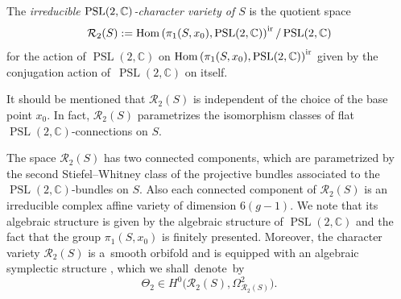 \documentclass[pdftex]{sigma}
\numberwithin{equation}{section}
\begin{document}
\begin{Definition}
The {\it irreducible ${\rm PSL}(2,{\mathbb C})$-character variety of $S$} is the quotient space
\begin{equation}\label{e11}
{\mathcal R}_2(S) := \operatorname{Hom}\left(\pi_1(S, x_0), \operatorname{PSL}(2,{\mathbb C})\right)^{\rm ir}/\operatorname{PSL}(2,{\mathbb C})
\end{equation}
for the action of $\operatorname{PSL}(2,{\mathbb C})$ on $\operatorname{Hom}\left(\pi_1(S, x_0), \operatorname{PSL}(2,{\mathbb
C})\right)^{\rm ir}$ given by the conjugation action of~$\operatorname{PSL}(2,{\mathbb C})$ on itself.
\end{Definition}

It should be mentioned that ${\mathcal R}_2(S)$ is independent of the choice of the base point $x_0$.
In fact, ${\mathcal R}_2(S)$ parametrizes the isomorphism classes of flat $\operatorname{PSL}(2,{\mathbb C})$-connections
on $S$.

The space ${\mathcal R}_2(S)$ has two connected components, which are parametrized
by the second Stiefel--Whitney class of the projective bundles associated to the
$\operatorname{PSL}(2,{\mathbb C})$-bundles on $S$. Also each connected component
of ${\mathcal R}_2(S)$ is an irreducible complex affine
variety of dimension $6(g-1)$. We note that its algebraic structure is given by the algebraic structure of
$\operatorname{PSL}(2,{\mathbb C})$ and the fact that the group $\pi_1(S, x_0)$ is
finitely presented. Moreover, the character variety ${\mathcal R}_2(S)$ is a~smooth orbifold
and is equipped with an algebraic symplectic structure \cite{ AB, Go}, which we shall~denote~by
\begin{equation}\label{e13}
\Theta_2 \in H^0\bigl({\mathcal R}_2(S), \Omega^2_{{\mathcal R}_2(S)}\bigr).
\end{equation}
\end{document}
